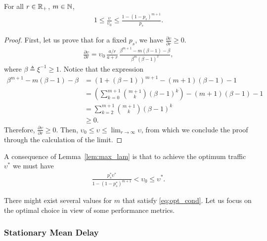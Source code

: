 \begin{lemma} \label{lem:max_lam}
    For all $r\in{\mathbb R}_+$, $m\in{\mathbb N}$,
    \begin{align*}
        1 \le \frac{\upsilon}{\upsilon_0} \le \frac{1-(1-p_s)^{m+1}}{p_s}.
    \end{align*}
\end{lemma}
%
\begin{proof}
    First, let us prove that for a fixed $p_s$, we have 
    $
        {\frac{\partial \upsilon}{\partial r} \ge 0}.
    $
    \begin{align*}
        \frac{\partial \upsilon}{\partial r} = \upsilon_0\, \frac{a/r}{a+r}\, \frac{\beta^{m+1} - m(\beta-1)-\beta}{\beta^m (\beta-1)^2},
    \end{align*}
    where $\beta\triangleq \xi^{-1} \ge 1$. Notice that the expression
    \begin{align*}
        \beta^{m+1} - m(\beta-1)-\beta &= (1+(\beta-1))^{m+1} - (m+1)(\beta-1) - 1 \\
            &= \left(\sum_{k=0}^{m+1} \binom{m+1}{k} (\beta-1)^k\right)- (m+1)(\beta-1) - 1\\
            &= \sum_{k=2}^{m+1} \binom{m+1}{k} (\beta-1)^k \\ &\ge 0.
    \end{align*}
    Therefore,
    $
        {\frac{\partial \upsilon}{\partial r}\ge 0}.
    $
    Then, $\displaystyle \upsilon_0 \le \upsilon \le \lim_{r\to\infty} \upsilon$, from which we conclude the proof through the calculation of the limit.
\end{proof}

A consequence of Lemma~\ref{lem:max_lam} is that to achieve the optimum traffic $\upsilon^*$ we must have
\begin{align} \label{eq:opt_cond}
    \frac{p_s^*\upsilon^*}{1-(1-p_s^*)^{m+1}} < \upsilon_0 \le \upsilon^*.
\end{align}

There might exist several values for $m$ that satisfy \eqref{eq:opt_cond}.
%
Let us focus on the optimal choice in view of some performance metrics.

\subsubsection{Stationary Mean Delay}

